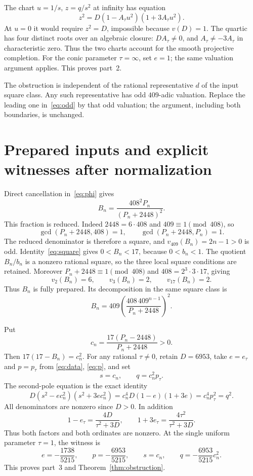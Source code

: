 \documentclass[11pt,a4paper]{article}
\begin{document}
The chart $u=1/s$, $z=q/s^2$ at infinity has equation
\[
               z^2=D(1-A_\tau u^2)(1+3A_\tau u^2).
\]
At $u=0$ it would require $z^2=D$, impossible because $v(D)=1$.
The quartic has four distinct roots over an algebraic closure:
$DA_\tau\ne0$, and $A_\tau\ne-3A_\tau$ in characteristic zero.
Thus the two charts account for the smooth projective completion.
For the conic parameter $\tau=\infty$, set $e=1$; the same
valuation argument applies. This proves part~2.

The obstruction is independent of the rational representative $d$ of
the input square class. Any such representative has odd $409$-adic
valuation. Replace the leading one in~\eqref{eq:odd} by that odd
valuation; the argument, including both boundaries, is unchanged.

\section{Prepared inputs and explicit witnesses after normalization}

Direct cancellation in~\eqref{eq:phi} gives
\begin{equation}\label{eq:B}
                B_n=\frac{408^2P_n}{(P_n+2448)^2}.
\end{equation}
This fraction is reduced. Indeed $2448=6\cdot408$ and
$409\equiv1\pmod{408}$, so
\[
 \gcd(P_n+2448,408)=1,
 \qquad \gcd(P_n+2448,P_n)=1.
\]
The reduced denominator is therefore a square, and
$v_{409}(B_n)=2n-1>0$ is odd. Identity~\eqref{eq:square} gives
$0<B_n<17$, because $0<b_n<1$.
The quotient $B_n/b_n$ is a nonzero rational square, so the three
local square conditions are retained. Moreover
$P_n+2448\equiv1\pmod{408}$ and $408=2^3\cdot3\cdot17$, giving
\[
                    v_2(B_n)=6,\qquad v_3(B_n)=2,
                    \qquad v_{17}(B_n)=2.
\]
Thus $B_n$ is fully prepared. Its decomposition in the same square
class is
\[
 B_n=409\left(\frac{408\,409^{n-1}}{P_n+2448}\right)^2.
\]

Put
\[
             c_n=\frac{17(P_n-2448)}{P_n+2448}>0.
\]
Then $17(17-B_n)=c_n^2$. For any rational $\tau\ne0$, retain
$D=6953$, take $e=e_\tau$ and $p=p_\tau$ from
\eqref{eq:data}, \eqref{eq:p}, and set
\begin{equation}\label{eq:witness}
                         s=c_n,\qquad q=c_n^2p_\tau.
\end{equation}
The second-pole equation is the exact identity
\[
 D(s^2-e c_n^2)(s^2+3e c_n^2)
          =c_n^4D(1-e)(1+3e)=c_n^4p_\tau^2=q^2.
\]
All denominators are nonzero since $D>0$. In addition
\[
 1-e_\tau=\frac{4D}{\tau^2+3D},\qquad
 1+3e_\tau=\frac{4\tau^2}{\tau^2+3D}.
\]
Thus both factors and both ordinates are nonzero. At the single
uniform parameter $\tau=1$, the witness is
\[
 e=-\frac{1738}{5215},\qquad p=-\frac{6953}{5215},\qquad
 s=c_n,\qquad q=-\frac{6953}{5215}c_n^2.
\]
This proves part~3 and Theorem~\ref{thm:obstruction}.
\end{document}
